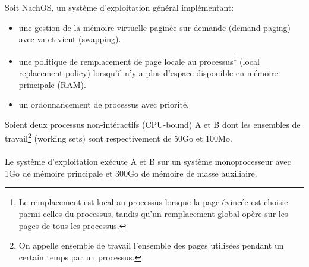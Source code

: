 \begin{questions}

%
%
Soit NachOS, un système d'exploitation général implémentant:
\begin{itemize}
  \item une gestion de la mémoire virtuelle paginée sur demande (demand paging) avec va-et-vient (swapping).
  \item une politique de remplacement de page locale au processus\footnote{Le remplacement est local au processus lorsque la page évincée est choisie parmi celles du processus, tandis qu'un remplacement global opère sur les pages de tous les processus.} (local replacement policy) lorsqu'il n'y a plus d'espace disponible en mémoire principale (RAM).
  \item un ordonnancement de processus avec priorité.
\end{itemize}
Soient deux processus non-intéractifs (CPU-bound) A et B dont les ensembles de travail\footnote{On appelle ensemble de travail l'ensemble des pages utilisées pendant un certain temps par un processus.} (working sets) sont respectivement de 50Go et 100Mo.\\\\
Le système d'exploitation exécute A et B sur un système monoprocesseur avec 1Go de mémoire principale et 300Go de mémoire de masse auxiliaire.

\end{questions}
